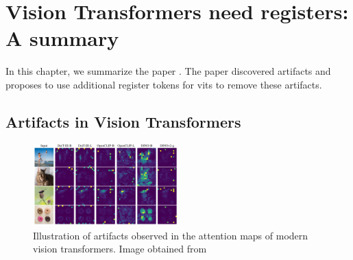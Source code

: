 \documentclass[conference]{IEEEtran}
\begin{document}
  \section{Vision Transformers need registers: A summary}
  \label{sec:registers}

  In this chapter, we summarize the paper \cite{registers}. The paper discovered artifacts and proposes to use additional register tokens for \acp{vit} to remove these artifacts.

  \subsection{Artifacts in Vision Transformers}
  \label{sec:registers:artifacts}

  \begin{figure}
    \centering
    \includegraphics[width=0.5\textwidth]{figures/vits-artifacts.png}
    \caption{Illustration of artifacts observed in the attention maps of modern vision transformers. Image obtained from \cite{registers}}
    \label{fig:artifacts-observations}
  \end{figure}
\end{document}
